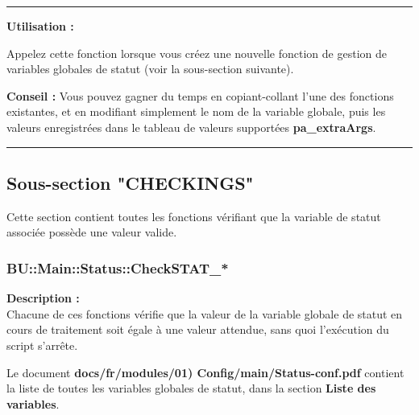 \documentclass[a4paper,10pt]{article}
\begin{document}
\setlength{\parskip}{1em}


\par\noindent\rule{\textwidth}{0.4pt}

\begin{justify}
    \textbf{Utilisation :}

    Appelez cette fonction lorsque vous créez une nouvelle fonction de gestion de variables globales de statut (voir la sous-section suivante).
\end{justify}

\begin{justify}
    \textbf{Conseil :} Vous pouvez gagner du temps en copiant-collant l'une des fonctions existantes, et en modifiant simplement le nom de la variable globale, puis les valeurs enregistrées dans le tableau de valeurs supportées \textbf{\color{vars}pa\_extraArgs}.
\end{justify}



\color{sec2}\par\noindent\rule{\textwidth}{0.4pt}\color{text}

\color{sec2}
\subsection{Sous-section "CHECKINGS"}\color{text}

\begin{justify}
    Cette section contient toutes les fonctions vérifiant que la variable de statut associée possède une valeur valide.
\end{justify}

\color{sec3}
\subsubsection{BU::Main::Status::CheckSTAT\_*}\color{text}

\begin{justify}
    \textbf{Description :}\\[1\baselineskip]
    Chacune de ces fonctions vérifie que la valeur de la variable globale de statut en cours de traitement soit égale à une valeur attendue, sans quoi l'exécution du script s'arrête.
\end{justify}

\begin{justify}
     Le document \textbf{\color{lime}docs/fr/modules/01) Config/main/Status-conf.pdf} contient la liste de toutes les variables globales de statut, dans la section \textbf{\color{sec1}Liste des variables}.
\end{justify}\setlength{\parskip}{1em}
\end{document}
